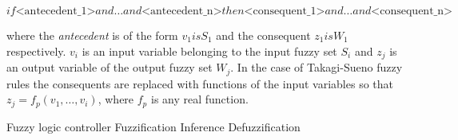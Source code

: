 \[
	if  \text{<antecedent_1>} and \ldots and \text{<antecedent_n>} then \text{<consequent_1>} and \ldots and \text{<consequent_n>}
\]

where the \textit{antecedent} is of the form $v_1 is S_1$ and the consequent $z_1 is W_1$ respectively. $v_i$ is an input variable belonging to the input fuzzy set $S_i$ and $z_j$ is an output variable of the output fuzzy set $W_j$.
In the case of Takagi-Sueno fuzzy rules the consequents are replaced with functions of the input variables so that $z_j = f_p(v_1, \ldots, v_i)$, where $f_p$ is any real function.

Fuzzy logic controller
Fuzzification
Inference
Defuzzification


